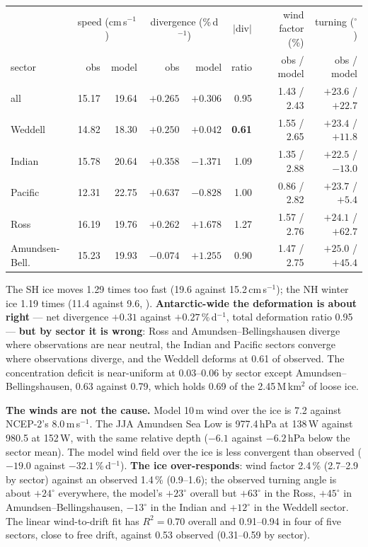 \documentclass[10pt]{article}
\begin{document}
\begin{center}\small
\begin{tabular}{lrrrrrrr}
\toprule
 & \multicolumn{2}{c}{speed (cm\,s$^{-1}$)} & \multicolumn{2}{c}{divergence (\%\,d$^{-1}$)} & $|$div$|$ & wind factor (\%) & turning ($^\circ$) \\
sector & obs & model & obs & model & ratio & obs / model & obs / model \\
\midrule
all             & 15.17 & 19.64 & $+0.265$ & $+0.306$ & 0.95 & 1.43 / 2.43 & $+23.6$ / $+22.7$ \\
Weddell         & 14.82 & 18.30 & $+0.250$ & $+0.042$ & \textbf{0.61} & 1.55 / 2.65 & $+23.4$ / $+11.8$ \\
Indian          & 15.78 & 20.64 & $+0.358$ & $-1.371$ & 1.09 & 1.35 / 2.88 & $+22.5$ / $-13.0$ \\
Pacific         & 12.31 & 22.75 & $+0.637$ & $-0.828$ & 1.00 & 0.86 / 2.82 & $+23.7$ / $+5.4$ \\
Ross            & 16.19 & 19.76 & $+0.262$ & $\mathbf{+1.678}$ & 1.27 & 1.57 / 2.76 & $+24.1$ / $\mathbf{+62.7}$ \\
Amundsen-Bell.  & 15.23 & 19.93 & $-0.074$ & $\mathbf{+1.255}$ & 0.90 & 1.47 / 2.75 & $+25.0$ / $\mathbf{+45.4}$ \\
\bottomrule
\end{tabular}
\end{center}

The SH ice moves 1.29 times too fast (19.6 against 15.2\,cm\,s$^{-1}$); the NH winter ice 1.19 times
(11.4 against 9.6, ). \textbf{Antarctic-wide
the deformation is about right} --- net divergence $+0.31$ against $+0.27$\,\%\,d$^{-1}$, total
deformation ratio 0.95 --- \textbf{but by sector it is wrong}: Ross and Amundsen--Bellingshausen
diverge where observations are near neutral, the Indian and Pacific sectors converge where
observations diverge, and the Weddell deforms at 0.61 of observed. The concentration deficit is
near-uniform at 0.03--0.06 by sector except Amundsen--Bellingshausen, 0.63 against 0.79, which holds
0.69 of the 2.45\,M\,km$^2$ of loose ice.

\textbf{The winds are not the cause.} Model 10\,m wind over the ice is 7.2 against NCEP-2's
8.0\,m\,s$^{-1}$. The JJA Amundsen Sea Low is 977.4\,hPa at 138\,W against 980.5 at 152\,W, with the
same relative depth ($-6.1$ against $-6.2$\,hPa below the sector mean). The model wind field over
the ice is less convergent than observed ($-19.0$ against $-32.1$\,\%\,d$^{-1}$). \textbf{The ice
over-responds}: wind factor 2.4\,\% (2.7--2.9 by sector) against an observed 1.4\,\% (0.9--1.6); the
observed turning angle is about $+24^\circ$ everywhere, the model's $+23^\circ$ overall but
$+63^\circ$ in the Ross, $+45^\circ$ in Amundsen--Bellingshausen, $-13^\circ$ in the Indian and
$+12^\circ$ in the Weddell sector. The linear wind-to-drift fit has $R^2=0.70$ overall and
0.91--0.94 in four of five sectors, close to free drift, against 0.53 observed (0.31--0.59 by
sector).
\end{document}
